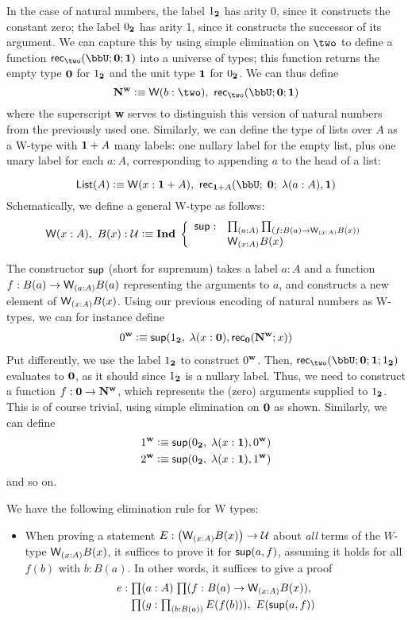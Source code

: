 In the case of natural numbers, the label $1_{\mathbf{2}} $ has arity 0, since it constructs the constant zero; the label $0_{\mathbf{2}}$ has arity 1, since it constructs the successor of its argument. We can capture this by using simple elimination on $\two$ to define a function $\rec\two(\bbU;\zero;\one)$ into a universe of types; this function returns the empty type $\mathbf{0}$ for $1_{\mathbf{2}}$ and the unit type $\mathbf{1}$ for $0_{\mathbf{2}}$. We can thus define
\[ \natw \defeq \wtype{b:\two} \rec\two(\bbU;\zero;\one) \]
where the superscript \textbf{w} serves to distinguish this version of natural numbers from the previously used one.
Similarly, we can define the type of lists over $A$ as a W-type with $\mathbf{1} + A$ many labels: one nullary label for the empty list, plus one unary label for each $a : A$, corresponding to appending $a$ to the head of a list:

\[ \lst A \defeq \wtype{x:\disj{\one}{A}} \rec{\disj{\one}{A}}(\bbU; \; \zero; \; \lambda{(a:A)}, \one) \]
Schematically, we define a general W-type as follows:
\[ \wtype{x:A} B(x) : \type \defeq \myInd \left\{
\begin{array}{ll}
\supp : & \prd{a:A}{f : B(a) \to \wtype{x:A} B(x)} \\ & \wtype{x:A} B(x)
\end{array}
\right. \]

The constructor $\mathsf{sup}$ (short for supremum) takes a label $a : A$ and a function $f : B(a) \to \wtype{a:A} B(a)$ representing the arguments to $a$, and constructs a new element of $\wtype{x:A} B(x)$. Using our previous encoding of natural numbers as W-types, we can for instance define
\begin{align*}
0^\mathbf{w} \vcentcolon\equiv \mathsf{sup}(1_{\mathbf{2}}, \; \lambda(x : \mathbf{0}), \mathsf{rec}_{\mathbf{0}}(\mathbf{N^w};x))
\end{align*}
Put differently, we use the label $1_{\mathbf{2}}$ to construct $0^\mathbf{w}$. Then, $\rec\two(\bbU;\zero;\one; \true)$ evaluates to $\mathbf{0}$, as it should since $1_{\mathbf{2}}$ is a nullary label. Thus, we need to construct a function $f : \mathbf{0} \to \mathbf{N^w}$, which represents the (zero) arguments supplied to $1_{\mathbf{2}}$. This is of course trivial, using simple elimination on $\mathbf{0}$ as shown. Similarly, we can define
\begin{align*}
1^\mathbf{w} \vcentcolon\equiv \mathsf{sup}(0_{\mathbf{2}}, \; \lambda(x : \mathbf{1}), 0^\mathbf{w}) \\
2^\mathbf{w} \vcentcolon\equiv \mathsf{sup}(0_{\mathbf{2}}, \; \lambda(x : \mathbf{1}), 1^\mathbf{w})
\end{align*}
and so on.

We have the following elimination rule for W types:
\begin{itemize}
\item When proving a statement $E : \big(\wtype{x:A} B(x)\big) \to \type$ about \emph{all} terms of the $W$-type $\wtype{x:A} B(x)$, it suffices to prove it for $\mathsf{sup}(a,f)$, assuming it holds for all $f(b)$ with $b : B(a)$. 
In other words, it suffices to give a proof 
\begin{align*}
e : & \; \prd{a:A}{f : B(a) \to \wtype{x:A} B(x)}\\ & \; \prd{g : \prd{b : B(a)} E(f(b))} E(\supp(a,f))
\end{align*}
\end{itemize}


